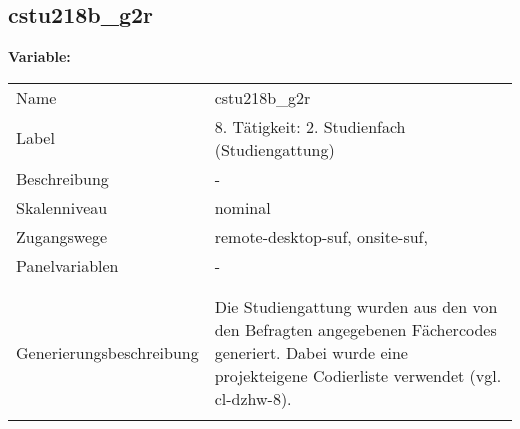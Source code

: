 	
	
	\subsection{cstu218b\_g2r}
	\label{subSection:cstu218b_g2r}

	\noindent\textbf{Variable:}\\
		\begin{tabular}{lL{11.3cm}}
			\label{tableVariable:cstu218b_g2r}
			Name & cstu218b\_g2r \\
			Label & 8. Tätigkeit: 2. Studienfach (Studiengattung) \\
			Beschreibung & - \\
			Skalenniveau & nominal \\
			Zugangswege &
				remote-desktop-suf,
				onsite-suf,
 \\
			Panelvariablen & -
			 \\
			 \\
 \\
					Generierungsbeschreibung & Die Studiengattung wurden aus den von den Befragten angegebenen Fächercodes generiert.  Dabei wurde eine projekteigene Codierliste verwendet (vgl. cl-dzhw-8).
				 \\	
			 \\
		\end{tabular}






